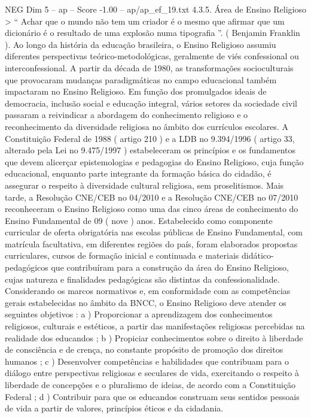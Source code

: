 \begin{textsample}{NEG Dim 5 – ap – Score -1.00 – ap/ap\_ef\_19.txt}  \label{ex:f5_neg_121}
4.3.5.
Área de Ensino Religioso > “ Achar que o mundo não tem um criador é o mesmo que afirmar que um dicionário é o resultado de uma explosão numa tipografia ”. ( Benjamin Franklin ).
Ao longo da história da educação brasileira, o Ensino Religioso assumiu diferentes perspectivas teórico-metodológicas, geralmente de viés confessional ou interconfessional.
A partir da década de 1980, as transformações socioculturais que provocaram mudanças paradigmáticas no campo educacional também impactaram no Ensino Religioso.
Em função dos promulgados ideais de democracia, inclusão social e educação integral, vários setores da sociedade civil passaram a reivindicar a abordagem do conhecimento religioso e o reconhecimento da diversidade religiosa no âmbito dos currículos escolares.
A Constituição Federal de 1988 ( artigo 210 ) e a LDB no 9.394/1996 ( artigo 33, alterado pela Lei no 9.475/1997 ) estabeleceram os princípios e os fundamentos que devem alicerçar epistemologias e pedagogias do Ensino Religioso, cuja função educacional, enquanto parte integrante da formação básica do cidadão, é assegurar o respeito à diversidade cultural religiosa, sem proselitismos.
Mais tarde, a Resolução CNE/CEB no 04/2010 e a Resolução CNE/CEB no 07/2010 reconheceram o Ensino Religioso como uma das cinco áreas de conhecimento do Ensino Fundamental de 09 ( nove ) anos.
Estabelecido como componente curricular de oferta obrigatória nas escolas públicas de Ensino Fundamental, com matrícula facultativa, em diferentes regiões do país, foram elaborados propostas curriculares, cursos de formação inicial e continuada e materiais didático-pedagógicos que contribuíram para a construção da área do Ensino Religioso, cujas natureza e finalidades pedagógicas são distintas da confessionalidade.
Considerando os marcos normativos e, em conformidade com as competências gerais estabelecidas no âmbito da BNCC, o Ensino Religioso deve atender os seguintes objetivos : a ) Proporcionar a aprendizagem dos conhecimentos religiosos, culturais e estéticos, a partir das manifestações religiosas percebidas na realidade dos educandos ; b ) Propiciar conhecimentos sobre o direito à liberdade de consciência e de crença, no constante propósito de promoção dos direitos humanos ; c ) Desenvolver competências e habilidades que contribuam para o diálogo entre perspectivas religiosas e seculares de vida, exercitando o respeito à liberdade de concepções e o pluralismo de ideias, de acordo com a Constituição Federal ; d ) Contribuir para que os educandos construam seus sentidos pessoais de vida a partir de valores, princípios éticos e da cidadania.

\end{textsample}
